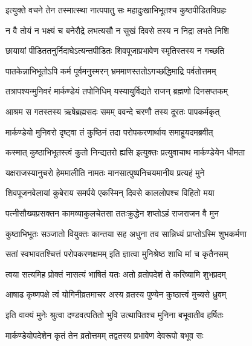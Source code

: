 \twolineshloka
{इत्युक्ते वचने तेन तस्मात्स्था नात्पपातु सः}
{महादुःखाभिभूतश्च कुष्ठपीडितविग्रहः} %

\twolineshloka
{न वै तोयं न भक्ष्यं च बनेरौद्रे लभत्यसौ}
{न सुखं दिवसे तस्य न निद्रा लभते निशि} %

\twolineshloka
{छायायां पीडिततनुर्निदाघेऽत्यन्तपीडितः}
{शिवपूजाप्रभावेण स्मृतिस्तस्य न गच्छति} %

\twolineshloka
{पातकेन्नाभिभूतोऽपि कर्म पूर्वमनुस्मरन्}
{भ्रममाणस्ततोऽगच्छद्धिमाद्रि पर्वतोत्तमम्} %

\twolineshloka
{तत्रापश्यन्मुनिवरं मार्कण्डेयं तपोनिधिम्}
{यस्यायुर्विद्यते राजन् ब्रह्मणो दिनसप्तकम्} %

\twolineshloka
{आश्रम स गतस्तस्य ऋषेब्रह्मसदः समम्}
{ववन्दे चरणौ तस्य दूरतः पापकर्मकृत्} %

\twolineshloka
{मार्कण्डेयो मुनिवरो दृष्ट्वा तं कुष्ठिनं तदा}
{परोपकरणार्थाय समाहूयदमब्रवीत्} %


\twolineshloka
{कस्मात् कुष्ठाभिभूतस्त्वं कुतो निन्द्यतरो ह्यसि}
{इत्युक्तः प्रत्युवाचाथ मार्कण्डेयेन धीमता} %


\twolineshloka
{यक्षराजस्यानुचरो हेममालीति नामतः}
{मानसात्पुष्पनिचयमानीय प्रत्यहं मुने} %

\twolineshloka
{शिवपूजनवेलायां कुबेराय समर्पये}
{एकस्मिन् दिवसे काललोपश्च विहितो मया} %

\twolineshloka
{पत्नीसौख्यप्रसक्तन कामव्याकुलचेतसा}
{ततःक्रुद्धेन शप्तोऽहं राजराजन वै मुन} %

\twolineshloka
{कुष्ठाभिभूतः सञ्जातो वियुक्तः कान्तया सह}
{अधुना तव सान्निध्यं प्राप्तोऽस्मि शुभकर्मणा} %

\twolineshloka
{सतां स्वभावतश्चित्तं परोपकरणक्षमम्}
{इति ज्ञात्वा मुनिश्रेष्ठ शाधि मां च कृतैनसम्} %


\twolineshloka
{त्वया सत्यमिह प्रोक्तं नासत्यं भाषितं यतः}
{अतो व्रतोपदेशं ते करिष्यामि शुभप्रदम्} %

\twolineshloka
{आषाढ कृष्णपक्षे त्वं योगिनीव्रतमाचर}
{अस्य व्रतस्य पुण्येन कुष्ठात्त्वं मुच्यसे ध्रुवम्} %

\twolineshloka
{इति वाक्यं मुनेः श्रुत्वा दण्डवत्पतितो भुवि}
{उत्थापितश्च मुनिना बभूवातीव हर्षितः} %

\twolineshloka
{मार्कण्डेयोपदेशेन कृतं तेन व्रतोत्तमम्}
{तद्वतस्य प्रभावेण देवरूपो बभूव सः} %

